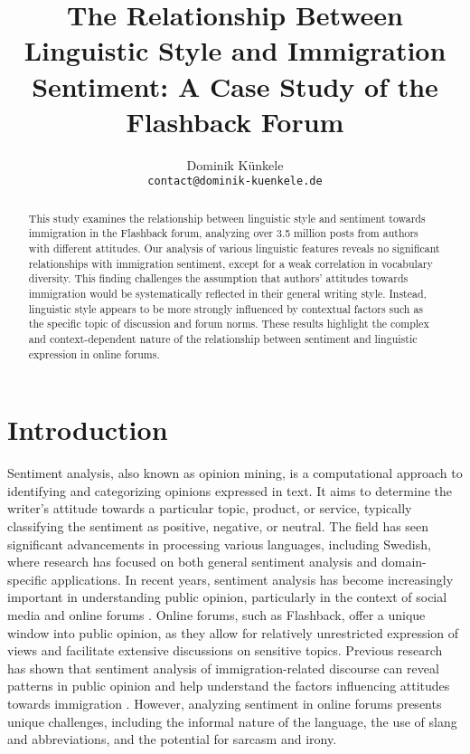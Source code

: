 \documentclass[11pt]{article}
\title{The Relationship Between Linguistic Style and Immigration Sentiment: A Case Study of the Flashback Forum}
\author{Dominik Künkele  \\
        \texttt{contact@dominik-kuenkele.de}}
\begin{document}
\maketitle
\begin{abstract}
        This study examines the relationship between linguistic style and sentiment towards immigration in the Flashback forum, analyzing over 3.5 million posts from authors with different attitudes.
        Our analysis of various linguistic features reveals no significant relationships with immigration sentiment, except for a weak correlation in vocabulary diversity.
        This finding challenges the assumption that authors' attitudes towards immigration would be systematically reflected in their general writing style.
        Instead, linguistic style appears to be more strongly influenced by contextual factors such as the specific topic of discussion and forum norms.
        These results highlight the complex and context-dependent nature of the relationship between sentiment and linguistic expression in online forums.
\end{abstract}


\section{Introduction}
Sentiment analysis, also known as opinion mining, is a computational approach to identifying and categorizing opinions expressed in text.
It aims to determine the writer's attitude towards a particular topic, product, or service, typically classifying the sentiment as positive, negative, or neutral.
The field has seen significant advancements in processing various languages, including Swedish, where research has focused on both general sentiment analysis \citep{Barnes2022} and domain-specific applications.
In recent years, sentiment analysis has become increasingly important in understanding public opinion, particularly in the context of social media and online forums \citep{Liu2012,Kokkinakis2022,Rouces2019}.
Online forums, such as Flashback, offer a unique window into public opinion, as they allow for relatively unrestricted expression of views and facilitate extensive discussions on sensitive topics.
Previous research has shown that sentiment analysis of immigration-related discourse can reveal patterns in public opinion and help understand the factors influencing attitudes towards immigration \citep{Berdicevskis2023}.
However, analyzing sentiment in online forums presents unique challenges, including the informal nature of the language, the use of slang and abbreviations, and the potential for sarcasm and irony.
\end{document}
